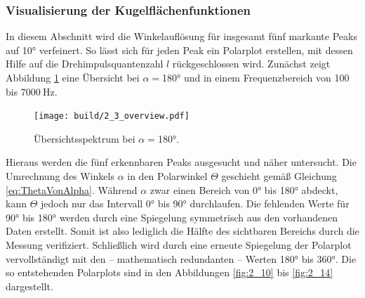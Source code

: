 \subsubsection{Visualisierung der Kugelflächenfunktionen}
\label{sec:VisYlm}
In diesem Abschnitt wird die Winkelauflösung für insgesamt fünf markante Peaks auf 10° verfeinert. So lässt sich für jeden Peak ein Polarplot erstellen, mit dessen Hilfe auf die Drehimpulsquantenzahl $l$ rückgeschlossen wird. Zunächst zeigt Abbildung \ref{fig:2_9} eine Übersicht bei $\alpha=$180° und in einem Frequenzbereich von 100 bis $\SI{7000}{\hertz}$.
\begin{figure}
  \centering
  \texttt{[image: build/2\_3\_overview.pdf]}  \caption{Übersichtsspektrum bei $\alpha=$180°.} \label{fig:2_9}
\end{figure}
Hieraus werden die fünf erkennbaren Peaks ausgesucht und näher untersucht. Die Umrechnung des Winkels $\alpha$ in den Polarwinkel $\Theta$ geschieht gemäß Gleichung \eqref{eq:ThetaVonAlpha}. Während $\alpha$ zwar einen Bereich von 0° bis 180° abdeckt, kann $\Theta$ jedoch nur das Intervall 0° bis 90° durchlaufen. Die fehlenden Werte für 90° bis 180° werden durch eine Spiegelung symmetrisch aus den vorhandenen Daten erstellt. Somit ist also lediglich die Hälfte des sichtbaren Bereichs durch die Messung verifiziert. Schließlich wird durch eine erneute Spiegelung der Polarplot vervollständigt mit den -- mathematisch redundanten -- Werten 180° bis 360°. Die so entstehenden Polarplots sind in den Abbildungen \ref{fig:2_10} bis \ref{fig:2_14} dargestellt.
